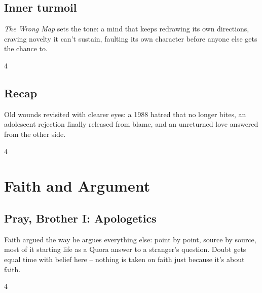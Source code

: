 \documentclass[a4paper,landscape]{memoir}
\begin{document}
\chapter{Inner turmoil}
\emph{The Wrong Map} sets the tone: a mind that keeps redrawing its own directions, craving novelty it can't sustain, faulting its own character before anyone else gets the chance to.
\clearpage\begin{multicols*}{4}








\end{multicols*}

\chapter{Recap}
Old wounds revisited with clearer eyes: a 1988 hatred that no longer bites, an adolescent rejection finally released from blame, and an unreturned love answered from the other side.
\clearpage\begin{multicols*}{4}




\end{multicols*}

\part{Faith and Argument}

\chapter{Pray, Brother I: Apologetics}
Faith argued the way he argues everything else: point by point, source by source, most of it starting life as a Quora answer to a stranger's question. Doubt gets equal time with belief here -- nothing is taken on faith just because it's about faith.
\clearpage\begin{multicols*}{4}




















\end{multicols*}
\end{document}
